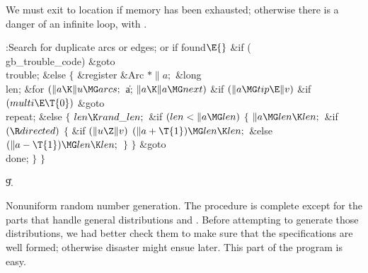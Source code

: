 We must exit to location  if memory has been exhausted;
otherwise there is a danger of an infinite loop, with .

\Y\B\4:Search for duplicate arcs or edges;  or  if found\X${}\E{}$\6
\&{if} (\\{gb\_trouble\_code})\1\5
\&{goto} \\{trouble};\2\6
\&{else}\5
${}\{{}$\5
\1\&{register} \&{Arc} ${}{*}\|a;{}$\6
\&{long} \\{len};\7
\&{for} ${}(\|a\K\|u\MG\\{arcs};{}$ \|a; ${}\|a\K\|a\MG\\{next}){}$\1\6
\&{if} ${}(\|a\MG\\{tip}\E\|v){}$\1\6
\&{if} ${}(\\{multi}\E\T{0}){}$\1\5
\&{goto} \\{repeat};\2\6
\&{else}\5
${}\{{}$\1\6
${}\\{len}\K\\{rand\_len};{}$\6
\&{if} ${}(\\{len}<\|a\MG\\{len}){}$\5
${}\{{}$\1\6
${}\|a\MG\\{len}\K\\{len};{}$\6
\&{if} ${}(\R\\{directed}){}$\5
${}\{{}$\1\6
\&{if} ${}(\|u\Z\|v){}$\1\5
${}(\|a+\T{1})\MG\\{len}\K\\{len};{}$\2\6
\&{else}\1\5
${}(\|a-\T{1})\MG\\{len}\K\\{len};{}$\2\6
\4${}\}{}$\2\6
\4${}\}{}$\2\6
\&{goto} \\{done};\6
\4${}\}{}$\2\2\2\6
\4${}\}{}$\2\par
\U9.\fi

Nonuniform random number generation. The 
procedure is
complete except for the parts that handle general distributions 
and . Before attempting to generate those distributions, we
had better
check them to make sure that the specifications are well formed;
otherwise disaster might ensue later. This part of the program is easy.

